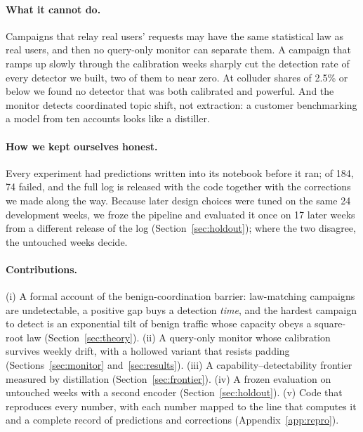 \paragraph{What it cannot do.} Campaigns that relay real users' requests may have the same statistical law as real users, and then no query-only monitor can separate them. A campaign that ramps up slowly through the calibration weeks sharply cut the detection rate of every detector we built, two of them to near zero. At colluder shares of 2.5\% or below we found no detector that was both calibrated and powerful. And the monitor detects coordinated topic shift, not extraction: a customer benchmarking a model from ten accounts looks like a distiller.

\paragraph{How we kept ourselves honest.} Every experiment had predictions written into its notebook before it ran; of 184, 74 failed, and the full log is released with the code together with the corrections we made along the way. Because later design choices were tuned on the same 24 development weeks, we froze the pipeline and evaluated it once on 17 later weeks from a different release of the log (Section~\ref{sec:holdout}); where the two disagree, the untouched weeks decide.

\paragraph{Contributions.} (i) A formal account of the benign-coordination barrier: law-matching campaigns are undetectable, a positive gap buys a detection \emph{time}, and the hardest campaign to detect is an exponential tilt of benign traffic whose capacity obeys a square-root law (Section~\ref{sec:theory}). (ii) A query-only monitor whose calibration survives weekly drift, with a hollowed variant that resists padding (Sections~\ref{sec:monitor} and~\ref{sec:results}). (iii) A capability--detectability frontier measured by distillation (Section~\ref{sec:frontier}). (iv) A frozen evaluation on untouched weeks with a second encoder (Section~\ref{sec:holdout}). (v) Code that reproduces every number, with each number mapped to the line that computes it and a complete record of predictions and corrections (Appendix~\ref{app:repro}).
